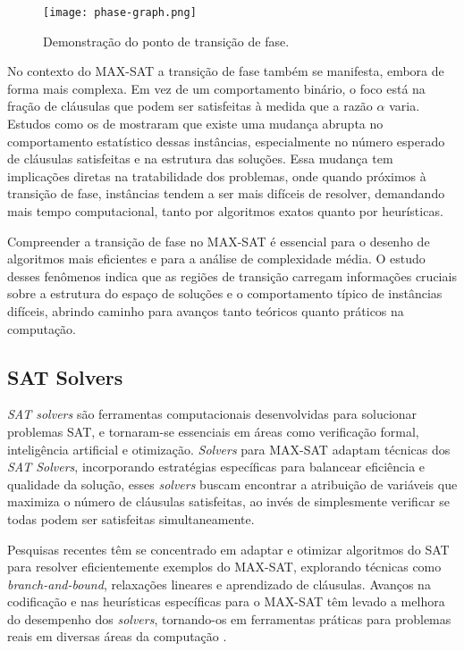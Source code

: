 \begin{figure}[!htb]
	\centering
	\caption[Demonstração do ponto de transição de fase]{Demonstração do ponto de transição de fase.}
	\texttt{[image: phase-graph.png]}
	\label{fig:phase-graph}
\end{figure}

No contexto do MAX-SAT a transição de fase também se manifesta, embora de forma mais complexa. Em vez de um comportamento binário, o foco está na fração de cláusulas que podem ser satisfeitas à medida que a razão $\alpha$ varia. Estudos como os de  mostraram que existe uma mudança abrupta no comportamento estatístico dessas instâncias, especialmente no número esperado de cláusulas satisfeitas e na estrutura das soluções. Essa mudança tem implicações diretas na tratabilidade dos problemas, onde quando próximos à transição de fase, instâncias tendem a ser mais difíceis de resolver, demandando mais tempo computacional, tanto por algoritmos exatos quanto por heurísticas.

Compreender a transição de fase no MAX-SAT é essencial para o desenho de algoritmos mais eficientes e para a análise de complexidade média. O estudo desses fenômenos indica que as regiões de transição carregam informações cruciais sobre a estrutura do espaço de soluções e o comportamento típico de instâncias difíceis, abrindo caminho para avanços tanto teóricos quanto práticos na computação.
 
\subsection{SAT Solvers}

\textit{SAT solvers} são ferramentas computacionais desenvolvidas para solucionar problemas SAT, e tornaram-se essenciais em áreas como verificação formal, inteligência artificial e otimização. \textit{Solvers} para MAX-SAT adaptam técnicas dos \textit{SAT Solvers}, incorporando estratégias específicas para balancear eficiência e qualidade da solução, esses \textit{solvers} buscam encontrar a atribuição de variáveis que maximiza o número de cláusulas satisfeitas, ao invés de simplesmente verificar se todas podem ser satisfeitas simultaneamente.

Pesquisas recentes têm se concentrado em adaptar e otimizar algoritmos do SAT para resolver eficientemente exemplos do MAX-SAT, explorando técnicas como \textit{branch-and-bound}, relaxações lineares e aprendizado de cláusulas. Avanços na codificação e nas heurísticas específicas para o MAX-SAT têm levado a melhora do desempenho dos \textit{solvers}, tornando-os em ferramentas práticas para problemas reais em diversas áreas da computação \cite{li2007new}.